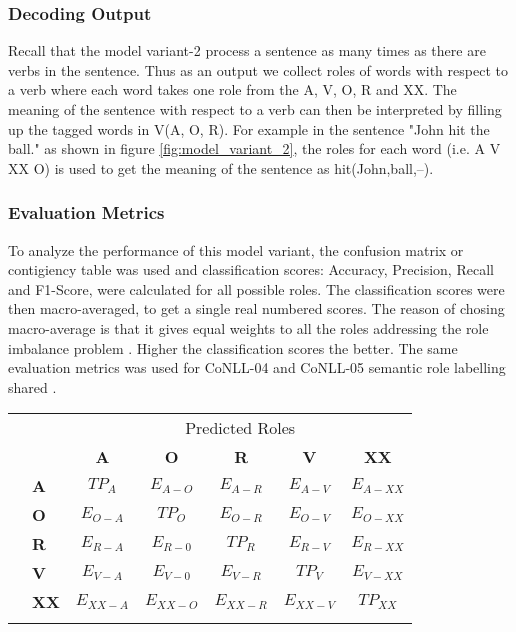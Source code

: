 \subsubsection{Decoding Output}

Recall that the model variant-2 process a sentence as many times as there are verbs in the sentence. Thus as an output we collect roles of words with respect to a verb where each word takes one role from the A, V, O, R and XX. The meaning of the sentence with respect to a verb can then be interpreted by filling up the tagged words in V(A, O, R). For example in the sentence "John hit the ball." as shown in figure \ref{fig:model_variant_2}, the roles for each word (i.e. A V XX O) is used to get the meaning of the sentence as hit(John,ball,--).

\subsubsection{Evaluation Metrics}\label{ssec:evaluation_metrics_2}

To analyze the performance of this model variant, the confusion matrix or contigiency table \cite{confusion_martrix:1998} was used and classification scores: Accuracy, Precision, Recall and F1-Score, were calculated for all possible roles. The classification scores were then macro-averaged, to get a single real numbered scores. The reason of chosing macro-average is that it gives equal weights to all the roles addressing the role imbalance problem \cite{macro_average:2005}. Higher the classification scores the better. The same evaluation metrics was used for CoNLL-04 and CoNLL-05 semantic role labelling shared \cite{conll:2004,conll:2005}.

\begin{tabular}{l|l|c|c|c|c|c|}
\multicolumn{2}{c}{}  &\multicolumn{5}{c}{Predicted Roles}\\
\cline{3-7}
\multicolumn{2}{c|}{} & \textbf{A} & \textbf{O} & \textbf{R} & \textbf{V} & \textbf{XX}\\
\hhline{|~|*6-|}
\multirow{5}{*}{True Roles}
& \textbf{A} 	& \cellcolor{gray!25}$TP_{A}$ & $E_{A-O}$ & $E_{A-R}$ & $E_{A-V}$ & $E_{A-XX}$ \\
\hhline{~|*6-}
& \textbf{O} 	& $E_{O-A}$ &\cellcolor{gray!25} $TP_{O}$ & $E_{O-R}$ & $E_{O-V}$ & $E_{O-XX}$ \\
\hhline{~|*6-}
& \textbf{R} 	& $E_{R-A}$ & $E_{R-0}$ & \cellcolor{gray!25}$TP_{R}$ & $E_{R-V}$ & $E_{R-XX}$ \\
\hhline{~|*6-}
& \textbf{V} 	& $E_{V-A}$ & $E_{V-0}$ & $E_{V-R}$ & \cellcolor{gray!25}$TP_{V}$ & $E_{V-XX}$ \\
\hhline{~|*6-}
& \textbf{XX} 	& $E_{XX-A}$ & $E_{XX-O}$ & $E_{XX-R}$ & $E_{XX-V}$ & \cellcolor{gray!25}$TP_{XX}$ \\
\hhline{~|*6-}
\end{tabular}\\

